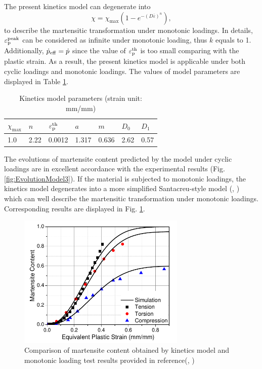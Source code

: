 \documentclass[preprint,5p,twocolumn,10pt,sort&compress]{elsarticle}
\begin{document}
The present kinetics model can degenerate into
\begin{equation}
\chi=\chi_{\max }\left(1-e^{-(D \overline{\varepsilon})^{n}}\right),
\end{equation}to describe the martensitic transformation under monotonic loadings. In details, $\varepsilon_{\rm p}^{\rm peak}$ can be considered as infinite under monotonic loading, thus $k$ equals to 1. Additionally, $\dot{p}_{\rm eff}=\dot{p}$ since the value of $\varepsilon_{\rm p}^{\rm th}$ is too small comparing with the plastic strain. As a result, the present kinetics model is applicable under both cyclic loadings and monotonic loadings. The values of model parameters are displayed in Table \ref{tab:Kinetics Model Parameters}.


\begin{table}[ht]
\centering
\caption{Kinetics model parameters (strain unit: mm/mm)}
\begin{tabular}{lllllll}
\hline
$\chi_{\max}$  &$n$       &$\varepsilon_{\rm p}^{\rm th}$ & $a$        & $m$        & $D_{0}$ & $D_{1}$ \\ \hline
1.0                 &2.22  &0.0012                            & 1.317 & 0.636  & 2.62        & 0.57  \\ \hline
\end{tabular}
\label{tab:Kinetics Model Parameters}
\end{table}


The evolutions of martensite content predicted by the model under cyclic loadings are in excellent accordance with the experimental results  (Fig. \ref{fig:EvolutionModel3}). If the material is subjected to monotonic loadings, the kinetics model degenerates into a more simplified Santacreu-style model (\citeauthor{QSP2014}, \citeyear{QSP2014}) which can well describe the martensitic transformation under monotonic loadings. Corresponding results are displayed in Fig. \ref{fig:EvolutionModel3formonotonic}.


\begin{figure}[ht]
  \begin{center}
  \includegraphics[width=8cm]{QinResult.pdf}
  \caption{Comparison of martensite content obtained by kinetics model and monotonic loading test results provided in reference(\citeauthor{QSP2014}, \citeyear{QSP2014})}
  \label{fig:EvolutionModel3formonotonic}
  \end{center}
\end{figure}
\end{document}
